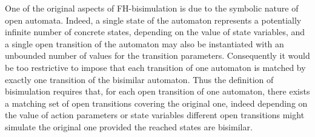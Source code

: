 \documentclass{lmcs}
\begin{document}
One of the original aspects of FH-bisimulation is due to the symbolic nature of open automata. Indeed, a single state of the automaton represents a potentially infinite number of concrete states, depending on the value of state variables, and a single open transition of the automaton may also be instantiated with an unbounded number of values for the transition parameters. Consequently it would be too restrictive to impose that each transition of one automaton is matched by exactly one transition of the bisimilar automaton. Thus the definition of bisimulation requires that, for each open transition of one automaton, there exists a matching  set of open transitions covering the original one, indeed depending on the value of action parameters or state variables different open transitions might simulate the original one provided the reached states are bisimilar.
\end{document}
